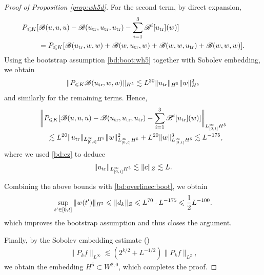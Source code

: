 \documentclass[UTF-8,reqno]{amsart}
\numberwithin{equation}{section}
\theoremstyle{definition}
\def\leq{\leqslant}
\def\leq{\leqslant}
\begin{document}
\begin{proof}[Proof of Proposition \ref{prop:wh5d}]
For the second term, by direct expansion,
\begin{align*}
  P_{\leq K}[&\mathscr{B}(u,u,u)-\mathscr{B}(u_{\rm tr},u_{\rm tr},u_{\rm tr})-\sum_{i=1}^3 \mathscr{B}^i[u_{\rm tr}](w)]\\
  &=  P_{\leq K}[ \mathscr{B}(u_{\rm tr},w,w)+\mathscr{B}(w,u_{\rm tr},w)+\mathscr{B}(w,w,u_{\rm tr})+\mathscr{B}(w,w,w)].
\end{align*}
Using the bootstrap assumption \eqref{bd:boot:wh5} together with Sobolev embedding, we obtain
\begin{align*}
   \|P_{\leq K}  \mathscr{B}(u_{\rm tr},w,w)\|_{H^{5}}\lesssim L^{20} \|u_{\rm tr}\|_{H^{5}}\|w\|_{H^{5}}^2 
\end{align*}
and similarly for the remaining terms. Hence,
\begin{align}
   &\bigg\|P_{\leq K}[\mathscr{B}(u,u,u)-\mathscr{B}(u_{\rm tr},u_{\rm tr},u_{\rm tr})-\sum_{i=1}^3 \mathscr{B}^i[u_{\rm tr}](w)]\bigg\|_{L^\infty_{[0,t]}H^{5}}\notag\\
   &\quad \lesssim L^{20} \|u_{\rm tr}\|_{L^\infty_{[0,t]}H^{5}}\|w\|_{L^\infty_{[0,t]}H^{5}}^2+L^{20} \|w\|_{L^\infty_{[0,t]}H^{5}}^3\lesssim L^{-175},\label{bd:mid6}
\end{align}
where we used \eqref{bd:cz} to deduce
\begin{align*}
    \|u_{\rm tr}\|_{L_{[0,t]}^\infty H^{5}}\lesssim \|c\|_{Z}\lesssim L.
\end{align*}

Combining the above bounds with \eqref{bd:overlinec:boot}, we obtain
\begin{align}
\sup_{t'\in[0,t]} \|w(t')\|_{H^{5}}\leq  \|d_k\|_{Z}\leq L^{70} \cdot L^{-175}\leq \frac12L^{-100}.\notag
\end{align}
 which improves the bootstrap assumption and thus closes the argument.
  
   
   
   Finally, by the Sobolev embedding estimate (\cite[(2.27)]{DIP25a})  
\begin{align*}
\|P_kf\|_{L^\infty}\lesssim (2^{k/2}+L^{-1/2})\|P_kf\|_{L^2},
\end{align*}
we obtain the embedding $H^{5} \subset W^{2,0}$,  which completes the proof.
\end{proof}
\end{document}
